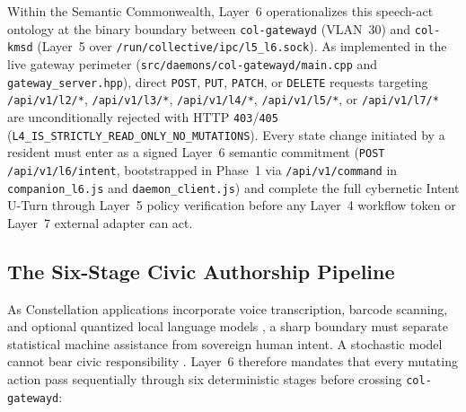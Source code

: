Within the Semantic Commonwealth, Layer~6 operationalizes this speech-act ontology at the binary boundary between \texttt{col-gatewayd} (VLAN~30) and \texttt{col-kmsd} (Layer~5 over \texttt{/run/collective/ipc/l5\_l6.sock}). As implemented in the live gateway perimeter (\texttt{src/daemons/col-gatewayd/main.cpp} and \texttt{gateway\_server.hpp}), direct \texttt{POST}, \texttt{PUT}, \texttt{PATCH}, or \texttt{DELETE} requests targeting \texttt{/api/v1/l2/*}, \texttt{/api/v1/l3/*}, \texttt{/api/v1/l4/*}, \texttt{/api/v1/l5/*}, or \texttt{/api/v1/l7/*} are unconditionally rejected with HTTP \texttt{403}/\texttt{405} (\texttt{L4\_IS\_STRICTLY\_READ\_ONLY\_NO\_MUTATIONS}). Every state change initiated by a resident must enter as a signed Layer~6 semantic commitment (\texttt{POST /api/v1/l6/intent}, bootstrapped in Phase~1 via \texttt{/api/v1/command} in \texttt{companion\_l6.js} and \texttt{daemon\_client.js}) and complete the full cybernetic Intent U-Turn through Layer~5 policy verification before any Layer~4 workflow token or Layer~7 external adapter can act.

\subsection{The Six-Stage Civic Authorship Pipeline}
\label{subsec:six-stage-pipeline}

As Constellation applications incorporate voice transcription, barcode scanning, and optional quantized local language models \parencite{willard2023outlines}, a sharp boundary must separate statistical machine assistance from sovereign human intent. A stochastic model cannot bear civic responsibility \parencite{bender2021parrots,illich1973}. Layer~6 therefore mandates that every mutating action pass sequentially through six deterministic stages before crossing \texttt{col-gatewayd}:

